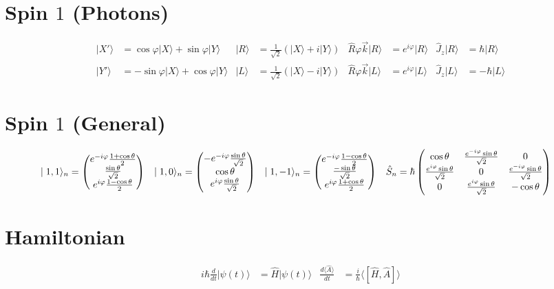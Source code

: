 \documentclass{article}
\newcommand{\ket}[1]{\ensuremath{\mid#1\rangle}}
\newcommand{\expect}[1]{\ensuremath{\langle#1\rangle}}
\newcommand{\op}[1]{\ensuremath{\hat#1}}
\newcommand{\mat}[1]{\ensuremath{\begin{pmatrix}\ensuremath{#1}\end{pmatrix}}}
\begin{document}
	\section*{Spin $1$ (Photons)}
	\begin{align*}
		\ket{X'}&=\cos\varphi\ket{X}+\sin\varphi\ket{Y} &
		\ket{R}&=\frac{1}{\sqrt{2}}(\ket{X}+i\ket{Y}) &
		\op{R\varphi\vec{k}}\ket{R}&=e^{i\varphi}\ket{R} &
		\op{J_z}\ket{R}&=\hbar\ket{R} \\
		\ket{Y'}&=-\sin\varphi\ket{X}+\cos\varphi\ket{Y} &
		\ket{L}&=\frac{1}{\sqrt{2}}(\ket{X}-i\ket{Y}) &
		\op{R\varphi\vec{k}}\ket{L}&=e^{i\varphi}\ket{L} &
		\op{J_z}\ket{L}&=-\hbar\ket{L}
	\end{align*}
	\section*{Spin $1$ (General)}
	\begin{align*}
		\ket{1,1}_n&=\mat{e^{-i\varphi}\frac{1+\cos\theta}{2}\\
			\frac{\sin\theta}{\sqrt2}\\
			e^{i\varphi}\frac{1-\cos\theta}{2}} &
		\ket{1,0}_n&=\mat{-e^{-i\varphi}\frac{\sin\theta}{\sqrt2}\\
			\cos\theta\\e^{i\varphi}\frac{\sin\theta}{\sqrt2}} &
		\ket{1,-1}_n&=\mat{e^{-i\varphi}\frac{1-\cos\theta}{2}\\
			\frac{-\sin\theta}{\sqrt2}\\
			e^{i\varphi}\frac{1+\cos\theta}{2}} &
		\op{S_n}&=\hbar\mat{
			\cos\theta&\frac{e^{-i\varphi}\sin\theta}{\sqrt2}&0\\
			\frac{e^{i\varphi}\sin\theta}{\sqrt{2}}&0&
				\frac{e^{-i\varphi}\sin\theta}{\sqrt2}\\
			0&\frac{e^{i\varphi}\sin\theta}{\sqrt2}&-\cos\theta}
	\end{align*}
	\section*{Hamiltonian}
	\begin{align*}
		i\hbar\frac{d}{dt}\ket{\psi(t)}&=\op{H}\ket{\psi(t)} &
		\frac{d\expect{\op{A}}}{dt}&=\frac{i}{\hbar}\expect{[\op{H},\op{A}]}
	\end{align*}
\end{document}
